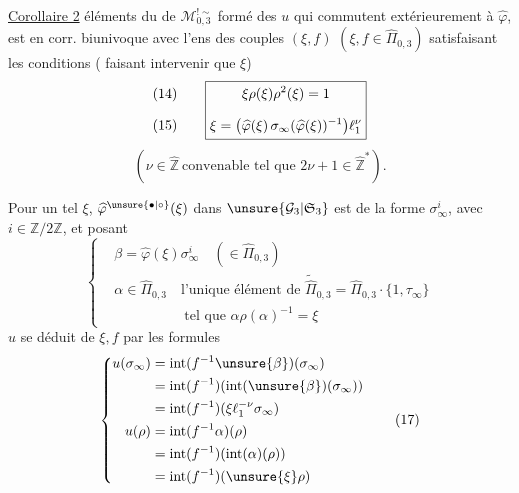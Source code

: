 
\uline{Corollaire 2}  éléments du  de
$\mathcal M_{0,3}^{!\sim}$ formé des $u$ qui commutent extérieurement à
$\widehat\varphi$, est  en corr. biunivoque avec
l'ens des couples $(\xi,f)$ \deleted{\unsure{$\in$}}
$(\xi,f\in\widehat\Pi_{0,3})$ satisfaisant les conditions
( faisant intervenir que $\xi$)
\[
\begin{array}{c@{\qquad}c}
\begin{gathered}(14)\\[1.8ex](15)\end{gathered}
&
\boxed{\begin{gathered}
\xi\rho(\xi)\rho^2(\xi)=1\\[1.8ex]
\xi=\bigl(\widehat\varphi(\xi)\,
\sigma_\infty(\widehat\varphi(\xi))^{-1}\bigr)\ell_1^\nu
\end{gathered}}
\end{array}
\]
\[
(\nu\in\widehat{\mathbb Z}\ \text{convenable tel que }
2\nu+1\in\widehat{\mathbb Z}^{*}).
\]

Pour un tel $\xi$, $\widehat\varphi^{\unsure{\bullet|\circ}}(\xi)$
dans $\unsure{\mathcal G_3|\mathfrak S_3}$ est de la forme
$\sigma_\infty^i$, avec $i\in\mathbb Z/2\mathbb Z$, et posant
\[
\left\{\begin{aligned}
&\beta=\widehat\varphi(\xi)\sigma_\infty^i
  \quad(\in\widehat\Pi_{0,3})\\
&\alpha\in\widehat\Pi_{0,3}\quad
  \text{l'unique élément de }\widetilde{\widehat\Pi}_{0,3}
  =\widehat\Pi_{0,3}\cdot\{1,\tau_\infty\}\\
&\hspace{5em}\text{tel que }\alpha\rho(\alpha)^{-1}=\xi
\end{aligned}\right.
\tag{16}
\]
$u$ se déduit de $\xi,f$ par les formules
\[
\left\{\begin{aligned}
u(\sigma_\infty)
 &=\operatorname{int}(f^{-1}\unsure{\beta})(\sigma_\infty)\\
 &=\operatorname{int}(f^{-1})(\operatorname{int}(\unsure{\beta})(\sigma_\infty))\\
 &=\operatorname{int}(f^{-1})(\xi\ell_1^{-\nu}\sigma_\infty)\\
u(\rho)
 &=\operatorname{int}(f^{-1}\alpha)(\rho)\\
 &=\operatorname{int}(f^{-1})(\operatorname{int}(\alpha)(\rho))\\
 &=\operatorname{int}(f^{-1})(\unsure{\xi}\rho)
\end{aligned}\right.
\tag{17}
\]

